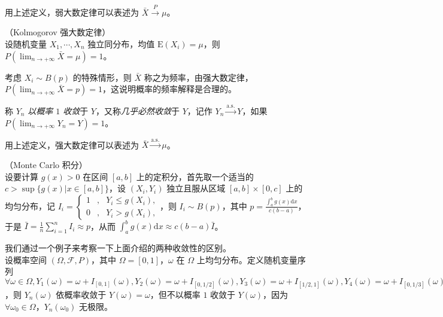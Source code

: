 \documentclass[../main.tex]{subfiles}
\begin{document}
用上述定义，弱大数定律可以表述为 $\bar X\overset{P}\rightarrow\mu$。

\begin{theorem}\label{thm:5.2.2}
    （Kolmogorov 强大数定律）\\
    设随机变量 $X_1,\cdots,X_n$ 独立同分布，均值 $\mathrm E(X_i)=\mu$，则 $P(\lim_{n\rightarrow+\infty}\bar X=\mu)=1$。
\end{theorem}

考虑 $X_i\sim B(p)$ 的特殊情形，则 $\bar X$ 称之为频率，由强大数定律，$P(\lim_{n\rightarrow+\infty}\bar X=p)=1$，这说明概率的频率解释是合理的。

\begin{definition}\label{def:5.2.2}
    称 $Y_n$ \emph{以概率 $1$ 收敛}于 $Y$，又称\emph{几乎必然收敛}于 $Y$，记作 $Y_n\overset{\mathrm{a.s.}}\rightarrow Y$，如果 $P(\lim_{n\rightarrow+\infty}Y_n=Y)=1$。
\end{definition}

用上述定义，强大数定律可以表述为 $\bar X\overset{\mathrm{a.s.}}\rightarrow\mu$。

\begin{example}
    （Monte Carlo 积分）\\
    设要计算 $g(x)>0$ 在区间 $[a,b]$ 上的定积分，首先取一个适当的 $c>\sup\{g(x)|x\in[a,b]\}$，设 $(X_i,Y_i)$ 独立且服从区域 $[a,b]\times[0,c]$ 上的均匀分布，记 $I_i=\left\{
        \begin{aligned}
            1 & , & Y_i\leq g(X_i), \\
            0 & , & Y_i>g(X_i),
        \end{aligned}
        \right.$，则 $I_i\sim B(p)$，其中 $p=\frac{\int_a^b g(x)\mathrm{d}x}{c(b-a)}$，于是 $\bar I=\frac1n\sum_{i=1}^nI_i\approx p$，从而 $\int_a^b g(x)\mathrm{d}x\approx c(b-a)\bar I$。
\end{example}

\begin{example}
    我们通过一个例子来考察一下上面介绍的两种收敛性的区别。\\
    设概率空间 $(\Omega,\mathcal F,P)$，其中 $\Omega=[0,1]$，$\omega$ 在 $\Omega$ 上均匀分布。定义随机变量序列 $\forall\omega\in\Omega,Y_1(\omega)=\omega+I_{[0,1]}(\omega),Y_2(\omega)=\omega+I_{[0,1/2]}(\omega),Y_3(\omega)=\omega+I_{[1/2,1]}(\omega),Y_4(\omega)=\omega+I_{[0,1/3]}(\omega),Y_5(\omega)=\omega+I_{[1/3,2/3]}(\omega),Y_6(\omega)=\omega+I_{[2/3,1]}(\omega),\cdots$，则 $Y_n(\omega)$ 依概率收敛于 $Y(\omega)=\omega$，但不以概率 $1$ 收敛于 $Y(\omega)$，因为 $\forall \omega_0\in\Omega$，$Y_n(\omega_0)$ 无极限。
\end{example}
\end{document}
